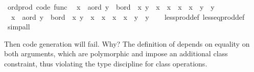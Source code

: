 \begin{isabellebody}
\isanewline
{}\isamarkupfalse%
\ ord{\isacharunderscore}prod\ {\isacharbrackleft}code\ func{\isacharbrackright}{\isacharcolon}\isanewline
\ \ {\isachardoublequoteopen}{\isacharparenleft}x{}\ {\isasymColon}\ {\isacharprime}a{\isasymColon}ord{\isacharcomma}\ y{}\ {\isasymColon}\ {\isacharprime}b{\isasymColon}ord{\isacharparenright}\ {\isacharless}\ {\isacharparenleft}x{}{\isacharcomma}\ y{}{\isacharparenright}\ {\isasymlongleftrightarrow}\ x{}\ {\isacharless}\ x{}\ {\isasymor}\ {\isacharparenleft}x{}\ {\isacharequal}\ x{}\ {\isasymand}\ y{}\ {\isacharless}\ y{}{\isacharparenright}{\isachardoublequoteclose}\isanewline
\ \ {\isachardoublequoteopen}{\isacharparenleft}x{}\ {\isasymColon}\ {\isacharprime}a{\isasymColon}ord{\isacharcomma}\ y{}\ {\isasymColon}\ {\isacharprime}b{\isasymColon}ord{\isacharparenright}\ {\isasymle}\ {\isacharparenleft}x{}{\isacharcomma}\ y{}{\isacharparenright}\ {\isasymlongleftrightarrow}\ x{}\ {\isacharless}\ x{}\ {\isasymor}\ {\isacharparenleft}x{}\ {\isacharequal}\ x{}\ {\isasymand}\ y{}\ {\isasymle}\ y{}{\isacharparenright}{\isachardoublequoteclose}\isanewline
%
\isadelimproof
\ \ %
\endisadelimproof
%
\isatagproof
{}\isamarkupfalse%
\ less{\isacharunderscore}prod{\isacharunderscore}def\ less{\isacharunderscore}eq{\isacharunderscore}prod{\isacharunderscore}def\ \isamarkupfalse%
\ simp{\isacharunderscore}all%
\endisatagproof
{\isafoldproof}%
%
\isadelimproof
%
\endisadelimproof
%
\begin{isamarkuptext}%
Then code generation will fail.  Why?  The definition
  of  depends on equality on both arguments,
  which are polymorphic and impose an additional 
  class constraint, thus violating the type discipline
  for class operations.


\end{isamarkuptext}
\end{isabellebody}
